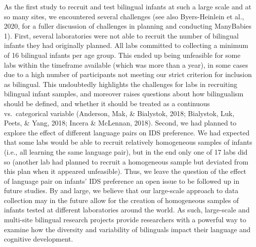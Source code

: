 \documentclass[,man,floatsintext]{apa6}
\begin{document}
As the first study to recruit and test bilingual infants at such a large scale and at so many sites, we encountered several challenges (see also Byers-Heinlein et al., 2020, for a fuller discussion of challenges in planning and conducting ManyBabies 1). First, several laboratories were not able to recruit the number of bilingual infants they had originally planned. All labs committed to collecting a minimum of 16 bilingual infants per age group. This ended up being unfeasible for some labs within the timeframe available (which was more than a year), in some cases due to a high number of participants not meeting our strict criterion for inclusion as bilingual. This undoubtedly highlights the challenges for labs in recruiting bilingual infant samples, and moreover raises questions about how bilingualism should be defined, and whether it should be treated as a continuous vs.~categorical variable (Anderson, Mak, \& Bialystok, 2018; Bialystok, Luk, Peets, \& Yang, 2018; Incera \& McLennan, 2018). Second, we had planned to explore the effect of different language pairs on IDS preference. We had expected that some labs would be able to recruit relatively homogeneous samples of infants (i.e., all learning the same language pair), but in the end only one of 17 labs did so (another lab had planned to recruit a homogeneous sample but deviated from this plan when it appeared unfeasible). Thus, we leave the question of the effect of language pair on infants' IDS preference an open issue to be followed up in future studies. By and large, we believe that our large-scale approach to data collection may in the future allow for the creation of homogeneous samples of infants tested at different laboratories around the world. As such, large-scale and multi-site bilingual research projects provide researchers with a powerful way to examine how the diversity and variability of bilinguals impact their language and cognitive development.
\end{document}
